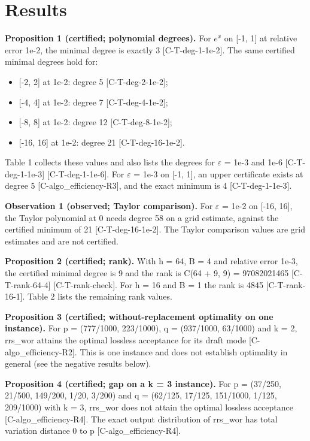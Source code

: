 \documentclass[10pt,twocolumn]{article}
\begin{document}
\section{Results}

\textbf{Proposition 1 (certified; polynomial degrees).} For $e^x$ on [-1, 1] at relative error 1e-2, the minimal degree is exactly 3 {\scriptsize[C-T-deg-1-1e-2]}. The same certified minimal degrees hold for:

\begin{itemize}
\item {}[-2, 2] at 1e-2: degree 5 {\scriptsize[C-T-deg-2-1e-2]};
\item {}[-4, 4] at 1e-2: degree 7 {\scriptsize[C-T-deg-4-1e-2]};
\item {}[-8, 8] at 1e-2: degree 12 {\scriptsize[C-T-deg-8-1e-2]};
\item {}[-16, 16] at 1e-2: degree 21 {\scriptsize[C-T-deg-16-1e-2]}.
\end{itemize}

Table 1 collects these values and also lists the degrees for $\varepsilon$ = 1e-3 and 1e-6 {\scriptsize[C-T-deg-1-1e-3]} {\scriptsize[C-T-deg-1-1e-6]}. For $\varepsilon$ = 1e-3 on [-1, 1], an upper certificate exists at degree 5 {\scriptsize[C-algo\_efficiency-R3]}, and the exact minimum is 4 {\scriptsize[C-T-deg-1-1e-3]}.

\textbf{Observation 1 (observed; Taylor comparison).} For $\varepsilon$ = 1e-2 on [-16, 16], the Taylor polynomial at 0 needs degree 58 on a grid estimate, against the certified minimum of 21 {\scriptsize[C-T-deg-16-1e-2]}. The Taylor comparison values are grid estimates and are not certified.

\textbf{Proposition 2 (certified; rank).} With h = 64, B = 4 and relative error 1e-3, the certified minimal degree is 9 and the rank is C(64 + 9, 9) = 97082021465 {\scriptsize[C-T-rank-64-4]} {\scriptsize[C-T-rank-check]}. For h = 16 and B = 1 the rank is 4845 {\scriptsize[C-T-rank-16-1]}. Table 2 lists the remaining rank values.

\textbf{Proposition 3 (certified; without-replacement optimality on one instance).} For p = (777/1000, 223/1000), q = (937/1000, 63/1000) and k = 2, rrs\_wor attains the optimal lossless acceptance for its draft mode {\scriptsize[C-algo\_efficiency-R2]}. This is one instance and does not establish optimality in general (see the negative results below).

\textbf{Proposition 4 (certified; gap on a k = 3 instance).} For p = (37/250, 21/500, 149/200, 1/20, 3/200) and q = (62/125, 17/125, 151/1000, 1/125, 209/1000) with k = 3, rrs\_wor does not attain the optimal lossless acceptance {\scriptsize[C-algo\_efficiency-R4]}. The exact output distribution of rrs\_wor has total variation distance 0 to p {\scriptsize[C-algo\_efficiency-R4]}.
\end{document}
